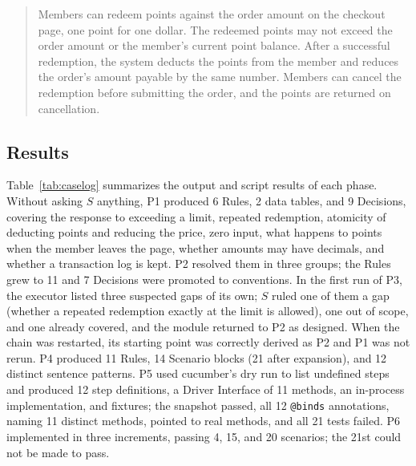 \documentclass[conference]{IEEEtran}
\newcommand{\code}[1]{\texttt{#1}}
\begin{document}
\begin{quote}\small
Members can redeem points against the order amount on the checkout page, one point for one dollar. The redeemed points may not exceed the order amount or the member's current point balance. After a successful redemption, the system deducts the points from the member and reduces the order's amount payable by the same number. Members can cancel the redemption before submitting the order, and the points are returned on cancellation.
\end{quote}

\subsection{Results}

Table~\ref{tab:caselog} summarizes the output and script results of each phase. Without asking $S$ anything, P1 produced 6 Rules, 2 data tables, and 9 Decisions, covering the response to exceeding a limit, repeated redemption, atomicity of deducting points and reducing the price, zero input, what happens to points when the member leaves the page, whether amounts may have decimals, and whether a transaction log is kept. P2 resolved them in three groups; the Rules grew to 11 and 7 Decisions were promoted to conventions. In the first run of P3, the executor listed three suspected gaps of its own; $S$ ruled one of them a gap (whether a repeated redemption exactly at the limit is allowed), one out of scope, and one already covered, and the module returned to P2 as designed. When the chain was restarted, its starting point was correctly derived as P2 and P1 was not rerun. P4 produced 11 Rules, 14 Scenario blocks (21 after expansion), and 12 distinct sentence patterns. P5 used cucumber's dry run to list undefined steps and produced 12 step definitions, a Driver Interface of 11 methods, an in-process implementation, and fixtures; the snapshot passed, all 12 \code{@binds} annotations, naming 11 distinct methods, pointed to real methods, and all 21 tests failed. P6 implemented in three increments, passing 4, 15, and 20 scenarios; the 21st could not be made to pass.
\end{document}
